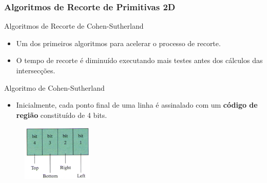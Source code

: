 \documentclass{beamer}
\begin{document}
\begin{frame}
\frametitle{Algoritmos de Recorte de Primitivas 2D}

	\begin{block}{Algoritmos de Recorte de Cohen-Sutherland}
		\begin{itemize}
			\item Um dos primeiros algoritmos para acelerar o processo de recorte.
			\item O tempo de recorte é diminuído executando mais testes antes dos cálculos das intersecções.
		\end{itemize}
	\end{block}
	\begin{block}{Algoritmo de Cohen-Sutherland}
		\begin{itemize}
			\item Inicialmente, cada ponto final de uma linha é assinalado com um \textbf{código de região} constituído de 4 bits.
		\end{itemize}
	\end{block}
	\begin{figure}[!h]
			\begin{center}
				\includegraphics[width=0.3\textwidth]{Figures/Cohen}
			\end{center}
	\end{figure}	
			
\end{frame}
\end{document}
